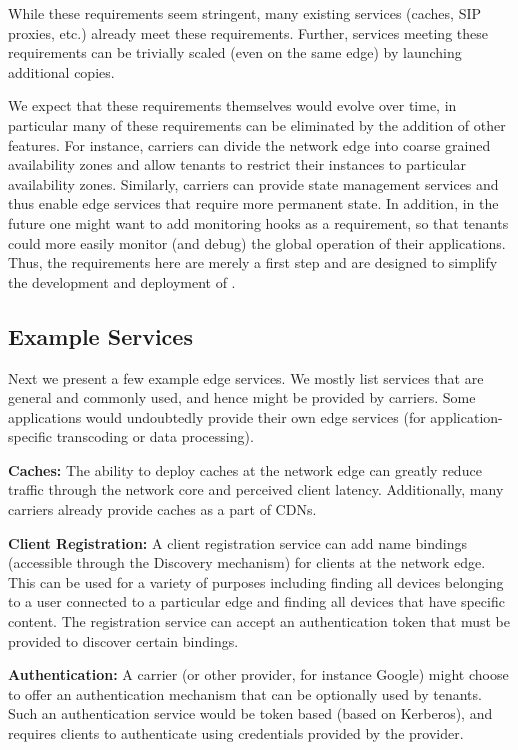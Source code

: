 While these requirements seem stringent, many existing services (caches, SIP proxies, etc.) already meet these requirements. Further, services meeting these requirements can be trivially scaled (even on the same edge) by launching additional copies.

We expect that these requirements themselves would evolve over time, in particular many of these requirements can be eliminated by the addition of other features. For instance, carriers can divide the network edge into coarse grained availability zones and allow tenants to restrict their instances to particular availability zones. Similarly, carriers can provide state management services and thus enable edge services that require more permanent state. In addition, in the future one might want to add monitoring hooks as a requirement, so that tenants could more easily monitor (and debug) the global operation of their applications. Thus, the requirements here are merely a first step and are designed to simplify the development and deployment of \name.


\subsection{Example Services}
Next we present a few example edge services. We mostly list services that are general and commonly used, and hence might be provided by carriers. Some applications would undoubtedly provide their own edge services (\eg for application-specific transcoding or data processing).

\textbf{Caches:} The ability to deploy caches at the network edge can greatly reduce traffic through the network core and perceived client latency. Additionally, many carriers already provide caches as a part of CDNs.

\textbf{Client Registration:} A client registration service can add name bindings (accessible through the Discovery mechanism) for clients at the network edge. This can be used for a variety of purposes including finding all devices belonging to a user connected to a particular edge and finding all devices that have specific content. The registration service can accept an authentication token that must be provided to discover certain bindings.

\textbf{Authentication:} A carrier (or other provider, for instance Google) might choose to offer an authentication mechanism that can be optionally used by tenants. Such an authentication service would be token based (\eg based on Kerberos), and requires clients to authenticate using credentials provided by the provider.

